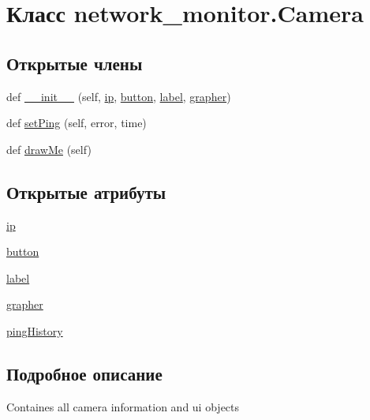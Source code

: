 \hypertarget{classnetwork__monitor_1_1_camera}{}\section{Класс network\+\_\+monitor.\+Camera}
\label{classnetwork__monitor_1_1_camera}
\subsection*{Открытые члены}
\begin{DoxyCompactItemize}
\item 
def \hyperlink{classnetwork__monitor_1_1_camera_a532428283b6b7737a01bdaf24989e8fe}{\+\_\+\+\_\+init\+\_\+\+\_\+} (self, \hyperlink{classnetwork__monitor_1_1_camera_a1bc250a15db245c87039d9984fe50b15}{ip}, \hyperlink{classnetwork__monitor_1_1_camera_ab51939018f21aebe68caa75c092d0098}{button}, \hyperlink{classnetwork__monitor_1_1_camera_afdb6d9fb249e5b2cc270e97572a40511}{label}, \hyperlink{classnetwork__monitor_1_1_camera_afdc20dd995418fb9a7c918ff41431ec0}{grapher})
\item 
def \hyperlink{classnetwork__monitor_1_1_camera_a6b175c56be99a6cb4ffcc058d878619b}{set\+Ping} (self, error, time)
\item 
def \hyperlink{classnetwork__monitor_1_1_camera_a2a22416b3e879c143b6e6d72034639c7}{draw\+Me} (self)
\end{DoxyCompactItemize}
\subsection*{Открытые атрибуты}
\begin{DoxyCompactItemize}
\item 
\hyperlink{classnetwork__monitor_1_1_camera_a1bc250a15db245c87039d9984fe50b15}{ip}
\item 
\hyperlink{classnetwork__monitor_1_1_camera_ab51939018f21aebe68caa75c092d0098}{button}
\item 
\hyperlink{classnetwork__monitor_1_1_camera_afdb6d9fb249e5b2cc270e97572a40511}{label}
\item 
\hyperlink{classnetwork__monitor_1_1_camera_afdc20dd995418fb9a7c918ff41431ec0}{grapher}
\item 
\hyperlink{classnetwork__monitor_1_1_camera_ae5f4e0501c0251f377ec26660c465e3b}{ping\+History}
\end{DoxyCompactItemize}


\subsection{Подробное описание}
\begin{DoxyVerb}Containes all camera information and ui objects\end{DoxyVerb}
 

